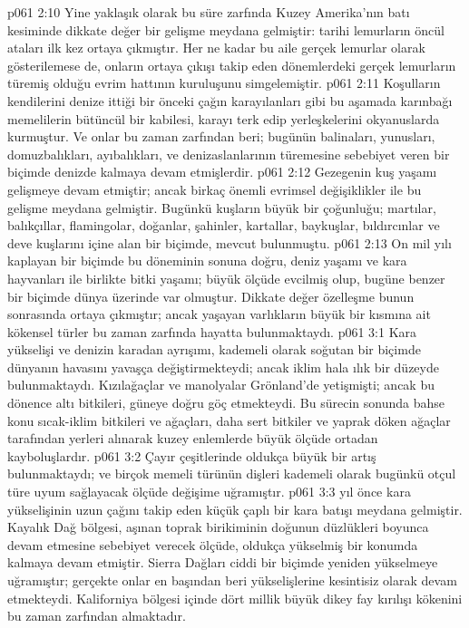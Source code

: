 \vs p061 2:10 Yine yaklaşık olarak bu süre zarfında Kuzey Amerika’nın batı kesiminde dikkate değer bir gelişme meydana gelmiştir: tarihi lemurların öncül ataları ilk kez ortaya çıkmıştır. Her ne kadar bu aile gerçek lemurlar olarak gösterilemese de, onların ortaya çıkışı takip eden dönemlerdeki gerçek lemurların türemiş olduğu evrim hattının kuruluşunu simgelemiştir.
\vs p061 2:11 Koşulların kendilerini denize ittiği bir önceki çağın karayılanları gibi bu aşamada karınbağı memelilerin bütüncül bir kabilesi, karayı terk edip yerleşkelerini okyanuslarda kurmuştur. Ve onlar bu zaman zarfından beri; bugünün balinaları, yunusları, domuzbalıkları, ayıbalıkları, ve denizaslanlarının türemesine sebebiyet veren bir biçimde denizde kalmaya devam etmişlerdir.
\vs p061 2:12 Gezegenin kuş yaşamı gelişmeye devam etmiştir; ancak birkaç önemli evrimsel değişiklikler ile bu gelişme meydana gelmiştir. Bugünkü kuşların büyük bir çoğunluğu; martılar, balıkçıllar, flamingolar, doğanlar, şahinler, kartallar, baykuşlar, bıldırcınlar ve deve kuşlarını içine alan bir biçimde, mevcut bulunmuştu.
\vs p061 2:13 On mil yılı kaplayan bir biçimde bu  döneminin sonuna doğru, deniz yaşamı ve kara hayvanları ile birlikte bitki yaşamı; büyük ölçüde evcilmiş olup, bugüne benzer bir biçimde dünya üzerinde var olmuştur. Dikkate değer özelleşme bunun sonrasında ortaya çıkmıştır; ancak yaşayan varlıkların büyük bir kısmına ait kökensel türler bu zaman zarfında hayatta bulunmaktaydı.
\vs p061 3:1 Kara yükselişi ve denizin karadan ayrışımı, kademeli olarak soğutan bir biçimde dünyanın havasını yavaşça değiştirmekteydi; ancak iklim hala ılık bir düzeyde bulunmaktaydı. Kızılağaçlar ve manolyalar Grönland’de yetişmişti; ancak bu dönence altı bitkileri, güneye doğru göç etmekteydi. Bu sürecin sonunda bahse konu sıcak\hyp{}iklim bitkileri ve ağaçları, daha sert bitkiler ve yaprak döken ağaçlar tarafından yerleri alınarak kuzey enlemlerde büyük ölçüde ortadan kayboluşlardır.
\vs p061 3:2 Çayır çeşitlerinde oldukça büyük bir artış bulunmaktaydı; ve birçok memeli türünün dişleri kademeli olarak bugünkü otçul türe uyum sağlayacak ölçüde değişime uğramıştır.
\vs p061 3:3  yıl önce kara yükselişinin uzun çağını takip eden küçük çaplı bir kara batışı meydana gelmiştir. Kayalık Dağ bölgesi, aşınan toprak birikiminin doğunun düzlükleri boyunca devam etmesine sebebiyet verecek ölçüde, oldukça yükselmiş bir konumda kalmaya devam etmiştir. Sierra Dağları ciddi bir biçimde yeniden yükselmeye uğramıştır; gerçekte onlar en başından beri yükselişlerine kesintisiz olarak devam etmekteydi. Kaliforniya bölgesi içinde dört millik büyük dikey fay kırılışı kökenini bu zaman zarfından almaktadır.
